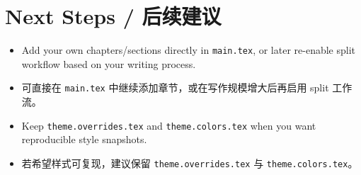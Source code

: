 \documentclass[oneside]{book}
\begin{document}


\chapter{Next Steps / 后续建议}

\begin{itemize}
    \item Add your own chapters/sections directly in \texttt{main.tex}, or later re-enable split workflow based on your writing process.
    \item 可直接在 \texttt{main.tex} 中继续添加章节，或在写作规模增大后再启用 split 工作流。
    \item Keep \texttt{theme.overrides.tex} and \texttt{theme.colors.tex} when you want reproducible style snapshots.
    \item 若希望样式可复现，建议保留 \texttt{theme.overrides.tex} 与 \texttt{theme.colors.tex}。
\end{itemize}
\end{document}
